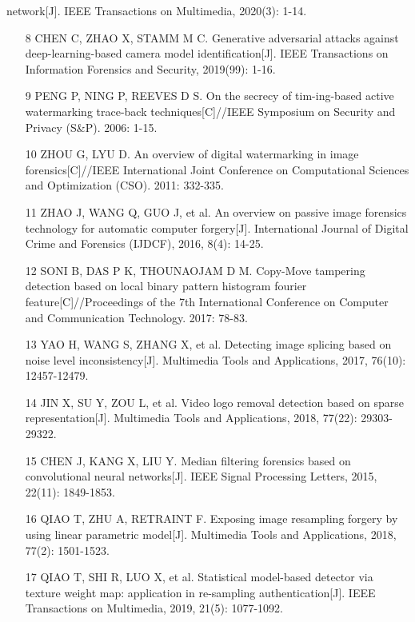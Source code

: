 \documentclass{article}
\begin{document}
network[J]. IEEE Transactions on Multimedia, 2020(3): 1-14.
\begin{itemize}
\item 
[8] CHEN C, ZHAO X, STAMM M C. Generative adversarial attacks against deep-learning-based camera model identification[J]. IEEE Transactions on Information Forensics and Security, 2019(99): 1-16.

\item 
[9] PENG P, NING P, REEVES D S. On the secrecy of tim-ing-based active watermarking trace-back techniques[C]//IEEE Symposium on Security and Privacy (S\&P). 2006: 1-15.

\item 
[10] ZHOU G, LYU D. An overview of digital watermarking in image forensics[C]//IEEE International Joint Conference on Computational Sciences and Optimization (CSO). 2011: 332-335.

\item 
[11] ZHAO J, WANG Q, GUO J, et al. An overview on passive image forensics technology for automatic computer forgery[J]. International Journal of Digital Crime and Forensics (IJDCF), 2016, 8(4): 14-25.

\item 
[12] SONI B, DAS P K, THOUNAOJAM D M. Copy-Move tampering detection based on local binary pattern histogram fourier feature[C]//Proceedings of the 7th International Conference on Computer and Communication Technology. 2017: 78-83.

\item 
[13] YAO H, WANG S, ZHANG X, et al. Detecting image splicing based on noise level inconsistency[J]. Multimedia Tools and Applications, 2017, 76(10): 12457-12479.

\item 
[14] JIN X, SU Y, ZOU L, et al. Video logo removal detection based on sparse representation[J]. Multimedia Tools and Applications, 2018, 77(22): 29303-29322.

\item 
[15] CHEN J, KANG X, LIU Y. Median filtering forensics based on convolutional neural networks[J]. IEEE Signal Processing Letters, 2015, 22(11): 1849-1853.

\item 
[16] QIAO T, ZHU A, RETRAINT F. Exposing image resampling forgery by using linear parametric model[J]. Multimedia Tools and Applications, 2018, 77(2): 1501-1523.

\item 
[17] QIAO T, SHI R, LUO X, et al. Statistical model-based detector via texture weight map: application in re-sampling authentication[J]. IEEE Transactions on Multimedia, 2019, 21(5): 1077-1092.


\end{itemize}
\end{document}
